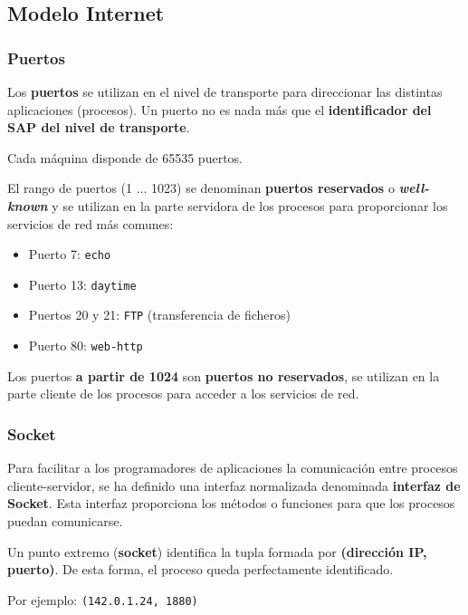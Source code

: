 \documentclass[a4paper]{book}
\begin{document}
\subsection{Modelo Internet}
\subsubsection{Puertos}
Los \textbf{puertos} se utilizan en el nivel de transporte para direccionar las distintas aplicaciones (procesos). Un puerto no es nada más que el \textbf{identificador del SAP del nivel de transporte}.

Cada máquina disponde de 65535 puertos.

El rango de puertos (1 ... 1023) se denominan \textbf{puertos reservados} o \textbf{\textsl{well-known}} y se utilizan en la parte servidora de los procesos para proporcionar los servicios de red más comunes:
\setlength{\columnsep}{-5cm}
\begin{multicols}{2}
  \begin{itemize}
    \item Puerto 7: \verb!echo!
    \item Puerto 13: \verb!daytime!
    \item Puertos 20 y 21: \verb!FTP! (transferencia de ficheros)
    \item Puerto 80: \verb!web-http!
  \end{itemize}
\end{multicols}

Los puertos \textbf{a partir de 1024} son \textbf{puertos no reservados}, se utilizan en la parte cliente de los procesos para acceder a los servicios de red.

\subsubsection{Socket}
Para facilitar a los programadores de aplicaciones la comunicación entre procesos cliente-servidor, se ha definido una interfaz normalizada denominada \textbf{interfaz de Socket}. Esta interfaz proporciona los métodos o funciones para que los procesos puedan comunicarse.

Un punto extremo (\textbf{socket}) identifica la tupla formada por \textbf{(dirección IP, puerto)}. De esta forma, el proceso queda perfectamente identificado.

Por ejemplo: \verb!(142.0.1.24, 1880)!
\end{document}
